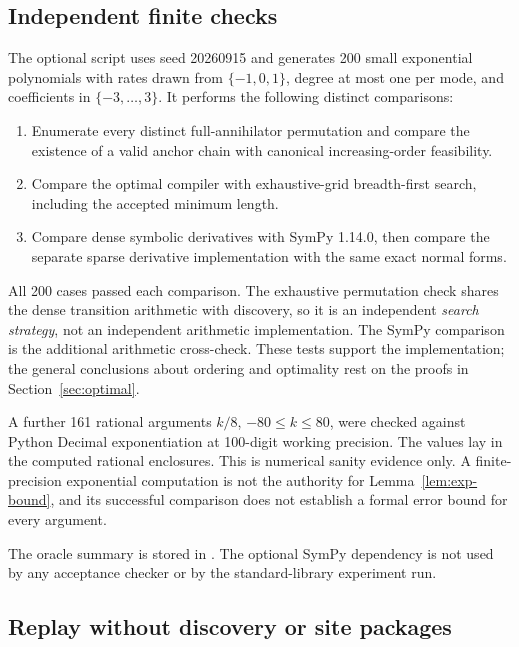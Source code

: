 \subsection{Independent finite checks}

The optional  script uses seed 20260915 and generates 200 small exponential polynomials with rates drawn from $\{-1,0,1\}$, degree at most one per mode, and coefficients in $\{-3,\ldots,3\}$. It performs the following distinct comparisons:

\begin{enumerate}
\item Enumerate every distinct full-annihilator permutation and compare the existence of a valid anchor chain with canonical increasing-order feasibility.
\item Compare the optimal compiler with exhaustive-grid breadth-first search, including the accepted minimum length.
\item Compare dense symbolic derivatives with SymPy 1.14.0, then compare the separate sparse derivative implementation with the same exact normal forms.
\end{enumerate}

All 200 cases passed each comparison. The exhaustive permutation check shares the dense transition arithmetic with discovery, so it is an independent \emph{search strategy}, not an independent arithmetic implementation. The SymPy comparison is the additional arithmetic cross-check. These tests support the implementation; the general conclusions about ordering and optimality rest on the proofs in Section~\ref{sec:optimal}.

A further 161 rational arguments $k/8$, $-80\le k\le80$, were checked against Python Decimal exponentiation at 100-digit working precision. The values lay in the computed rational enclosures. This is numerical sanity evidence only. A finite-precision exponential computation is not the authority for Lemma~\ref{lem:exp-bound}, and its successful comparison does not establish a formal error bound for every argument.

The oracle summary is stored in . The optional SymPy dependency is not used by any acceptance checker or by the standard-library experiment run.

\subsection{Replay without discovery or site packages}

